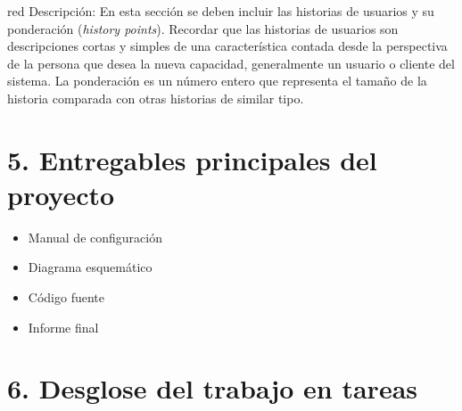 \documentclass[11pt]{charter}
\begin{document}
\begin{consigna}{red}
Descripción: En esta sección se deben incluir las historias de usuarios y su ponderación (\textit{history points}). Recordar que las historias de usuarios son descripciones cortas y simples de una característica contada desde la perspectiva de la persona que desea la nueva capacidad, generalmente un usuario o cliente del sistema. La ponderación es un número entero que representa el tamaño de la historia comparada con otras historias de similar tipo.
\end{consigna}

\section{5. Entregables principales del proyecto}
\label{sec:entregables}

\begin{itemize}
\item Manual de configuración
\item Diagrama esquemático
\item Código fuente
\item Informe final
\end{itemize}

\section{6. Desglose del trabajo en tareas}
\label{sec:wbs}
\end{document}
